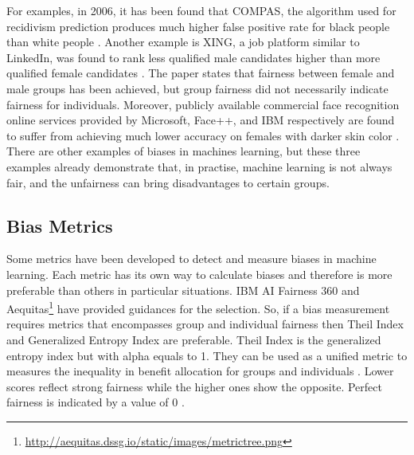 \documentclass[sigconf,review]{acmart}
\begin{document}
For examples, in 2006, it has been found that COMPAS, the algorithm used for recidivism prediction produces much higher false positive rate for black people than white people \cite{angwin2016machine}. Another example is XING, a job platform similar to LinkedIn, was found to rank less qualified male candidates higher than more qualified female candidates \cite{lahoti2019ifair}. The paper states that fairness between female and male groups has been achieved, but group fairness did not necessarily indicate fairness for individuals. Moreover, publicly available commercial face recognition online services provided by Microsoft, Face++, and IBM respectively are found to suffer from achieving much lower accuracy on females with darker skin color \cite{buolamwini2018gender}. There are other examples of biases in machines learning, but these three examples already demonstrate that, in practise, machine learning is not always fair, and the unfairness can bring disadvantages to certain groups. 


\subsection{Bias Metrics}
\label{sec:bias_metrics}


Some metrics have been developed to detect and measure biases in machine learning. Each metric has its own way to calculate biases and therefore is more preferable than others in particular situations. IBM AI Fairness 360 \cite{mahoney2020ai,ibmaif3602022guidance} and Aequitas\footnote{\url{http://aequitas.dssg.io/static/images/metrictree.png}} have provided guidances for the selection. So, if a bias measurement requires metrics that encompasses group and individual fairness then Theil Index \cite{conceicao2000theyoung,bellamy2018ai} and Generalized Entropy Index \cite{speicher2018unified} are preferable. Theil Index is the generalized entropy index  but with alpha equals to 1. They can be used as a unified metric to measures the inequality in benefit allocation for groups and individuals \cite{ibmaif3602022guidance,mahoney2020ai}. Lower scores reflect strong fairness while the higher ones show the opposite. Perfect fairness is indicated by a value of 0 \cite{lale2022doc}. 
\end{document}
